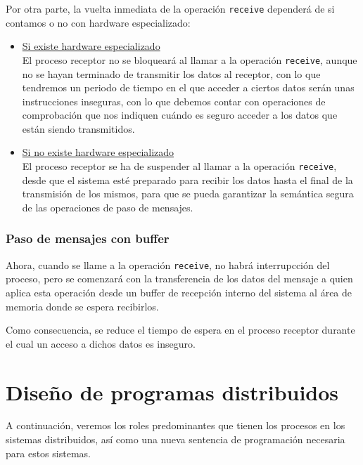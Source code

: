 Por otra parte, la vuelta inmediata de la operación \verb|receive| dependerá de si contamos o no con hardware especializado:
\begin{itemize}
    \item \ul{Si existe hardware especializado}~\\
        El proceso receptor no se bloqueará al llamar a la operación \verb|receive|, aunque no se hayan terminado de transmitir los datos al receptor, con lo que tendremos un periodo de tiempo en el que acceder a ciertos datos serán unas instrucciones inseguras, con lo que debemos contar con operaciones de comprobación que nos indiquen cuándo es seguro acceder a los datos que están siendo transmitidos.
    \item \ul{Si no existe hardware especializado}~\\
        El proceso receptor se ha de suspender al llamar a la operación \verb|receive|, desde que el sistema esté preparado para recibir los datos hasta el final de la transmisión de los mismos, para que se pueda garantizar la semántica segura de las operaciones de paso de mensajes.
\end{itemize}

\subsubsection{Paso de mensajes con buffer}
Ahora, cuando se llame a la operación \verb|receive|, no habrá interrupcción del proceso, pero se comenzará con la transferencia de los datos del mensaje a quien aplica esta operación desde un buffer de recepción interno del sistema al área de memoria donde se espera recibirlos.

Como consecuencia, se reduce el tiempo de espera en el proceso receptor durante el cual un acceso a dichos datos es inseguro.

\section{Diseño de programas distribuidos}
A continuación, veremos los roles predominantes que tienen los procesos en los sistemas distribuidos, así como una nueva sentencia de programación necesaria para estos sistemas.

